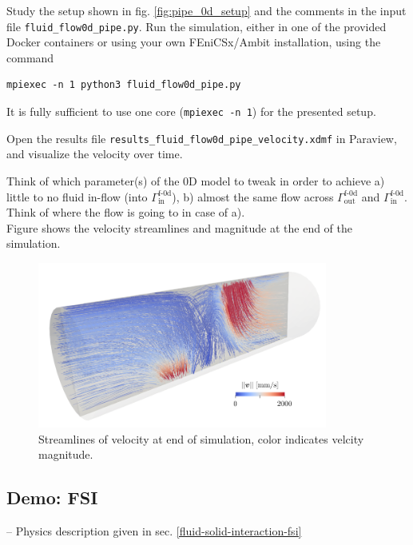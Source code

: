 \documentclass[a4paper,12pt]{report}
\begin{document}
Study the setup shown in fig. \ref{fig:pipe_0d_setup} and the comments in the input file \verb"fluid_flow0d_pipe.py". Run the simulation, either in one of the provided Docker containers or using your own FEniCSx/Ambit installation, using the command
\begin{verbatim}
mpiexec -n 1 python3 fluid_flow0d_pipe.py
\end{verbatim}
It is fully sufficient to use one core (\verb"mpiexec -n 1") for the presented setup.

Open the results file \verb"results_fluid_flow0d_pipe_velocity.xdmf" in Paraview, and visualize the velocity over time.

Think of which parameter(s) of the 0D model to tweak in order to achieve a) little to no fluid in-flow (into $\mathit{\Gamma}_{\mathrm{in}}^{\mathrm{f\text{-}0d}}$), b) almost the same flow across $\mathit{\Gamma}_{\mathrm{out}}^{\mathrm{f\text{-}0d}}$ and $\mathit{\Gamma}_{\mathrm{in}}^{\mathrm{f\text{-}0d}}$. Think of where the flow is going to in case of a).\\

Figure shows the velocity streamlines and magnitude at the end of the simulation.

\begin{figure}
\centering
\includegraphics[width=0.85\textwidth]{fig/pipe_0d_results.png}
\caption{Streamlines of velocity at end of simulation, color indicates velcity magnitude.}
\label{fig:pipe_0d_results}
\end{figure}


\subsection{Demo: FSI}\label{demo-fsi}

-- Physics description given in sec. \ref{fluid-solid-interaction-fsi}\\
\end{document}
